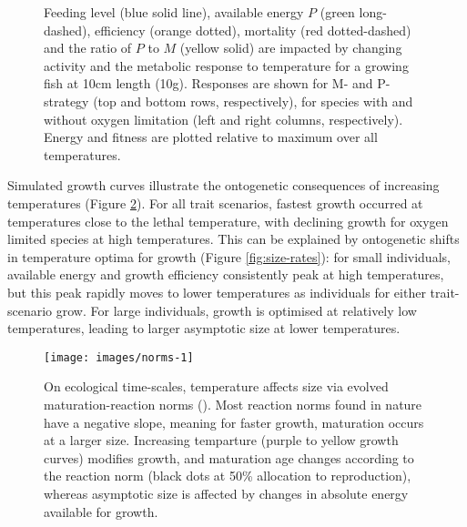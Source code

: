 \documentclass[a4paper, toc=index,abstract=true]{scrartcl}\usepackage[]{graphicx}\usepackage[]{color}
\makeatletter
\def\maxwidth{ %
  \ifdim\Gin@nat@width>\linewidth
    \linewidth
  \else
    \Gin@nat@width
  \fi
}
\makeatother
\begin{document}
\begin{spacing}{1.9}
\begin{figure}
\caption[Feeding level (blue solid line), available energy $P$ (green long-dashed), efficiency (orange dotted), mortality (red dotted-dashed) and the ratio of $P$ to $M$ (yellow solid) are impacted by changing activity and the metabolic response to temperature for a growing fish at 10cm length (10g)]{Feeding level (blue solid line), available energy $P$ (green long-dashed), efficiency (orange dotted), mortality (red dotted-dashed) and the ratio of $P$ to $M$ (yellow solid) are impacted by changing activity and the metabolic response to temperature for a growing fish at 10cm length (10g). Responses are shown for M- and P-strategy (top and bottom rows, respectively), for species with and without oxygen limitation (left and right columns, respectively). Energy and fitness are plotted relative to maximum over all temperatures.}\label{fig:feeding}
\end{figure}



Simulated growth curves illustrate the ontogenetic consequences of increasing temperatures (Figure \ref{fig:norms}). For all trait scenarios, fastest growth occurred at temperatures close to the lethal temperature, with declining growth for oxygen limited species at high temperatures. This can be explained by ontogenetic shifts in temperature optima for growth (Figure \ref{fig:size-rates}): for small individuals, available energy and growth efficiency consistently peak at high temperatures, but this peak rapidly moves to lower temperatures as individuals for either trait-scenario grow. For large individuals, growth is optimised at relatively low temperatures, leading to larger asymptotic size at lower temperatures. 





\begin{figure}

{\centering \texttt{[image: images/norms-1]} 

}

\caption[On ecological time-scales, temperature affects size via evolved maturation-reaction norms (\cite{marty_impact_2011})]{On ecological time-scales, temperature affects size via evolved maturation-reaction norms (\cite{marty_impact_2011}). Most reaction norms found in nature have a negative slope, meaning for faster growth, maturation occurs at a larger size. Increasing temparture (purple to yellow growth curves) modifies growth, and maturation age changes according to the reaction norm (black dots at 50\% allocation to reproduction), whereas asymptotic size is affected by changes in absolute energy available for growth.}\label{fig:norms}
\end{figure}




\end{spacing}
\end{document}
